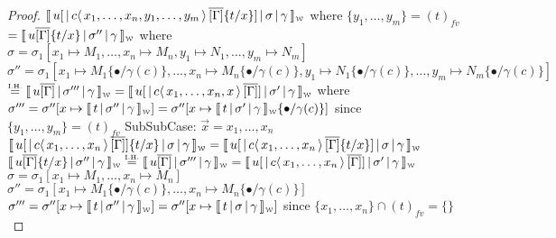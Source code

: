 \documentclass[a4paper,UKenglish,cleveref, autoref]{lipics-v2019}
\newcommand{\fv}[1]{(#1)_{fv}}
\newcommand{\set}[1]{ \{ #1 \} }
\newcommand{\dist}[5]{#1 [ #2 \, \vert \, \fakedist{#4}{#5} \, #3 ]}
\newcommand{\fakedist}[2]{#1 \langle \, #2 \, \rangle}
\newcommand{\sub}[3]{#1 \{ #2 / #3 \}}
\newcommand{\weaksymbol}{\mbox{\tiny $\mathcal{W}$}}
\newcommand{\readweakwmap}[3]{\llbracket \, #1 \, \vert \, #2 \, \vert \, #3  \, \rrbracket_{\weaksymbol} }
\newcommand{\IH}{\stackrel{\hbox{\tiny I.H.}}{\hbox{=}}}
\begin{document}
\begin{proof}
\newline
$\readweakwmap{\dist{u}{}{\overline{[\Gamma]}  \sub{}{t}{x}}{c}{x_{1}, \dots, x_{n}, y_{1}, \dots, y_{m}}}{\sigma}{\gamma}$
\newline
where $\set{y_{1}, \dots, y_{m}} = \fv{t}$
\newline
$= \readweakwmap{u \overline{[\Gamma]} \sub{}{t}{x}}{\sigma''}{\gamma}$
\newline
where
\newline
$\sigma = \sigma_{1}[x_{1} \mapsto M_{1}, \dots, x_{n} \mapsto M_{n}, y_{1} \mapsto N_{1}, \dots, y_{m} \mapsto N_{m}]$
\newline
$\sigma'' = \sigma_{1} [ x_{1} \mapsto M_{1} \sub{}{\bullet}{\gamma(c)}, \dots, x_{n} \mapsto M_{n}\sub{}{\bullet}{\gamma(c)}, y_{1} \mapsto N_{1}\sub{}{\bullet}{\gamma(c)}, \dots, y_{m} \mapsto N_{m}\sub{}{\bullet}{\gamma(c)} ] $
\newline
$\IH \readweakwmap{u \overline{[\Gamma]} }{\sigma'''}{\gamma} = \readweakwmap{\dist{u}{}{\overline{[\Gamma]}}{c}{x_{1}, \dots, x_{n}, x}}{\sigma'}{\gamma}$
\newline
where
$\sigma''' = \sigma'' [x \mapsto \readweakwmap{t}{\sigma''}{\gamma}] = \sigma'' [x \mapsto \readweakwmap{t}{\sigma'}{\gamma} \sub{}{\bullet}{\gamma(c)}]$
\newline
since $\set{y_{1}, \dots, y_{m}} = \fv{t}$
\newline
\newline
\indent \indent SubSubCase: $\vec{x} = x_{1}, \dots, x_{n}$
\newline
$\readweakwmap{\dist{u}{}{\overline{[\Gamma]}}{c}{x_{1}, \dots, x_{n}} \sub{}{t}{x}}{\sigma}{\gamma} = \readweakwmap{\dist{u}{}{\overline{[\Gamma]} \sub{}{t}{x} }{c}{x_{1}, \dots, x_{n}} }{\sigma}{\gamma}$
\newline
$\readweakwmap{u \overline{[\Gamma]} \sub{}{t}{x}}{\sigma''}{\gamma} \IH \readweakwmap{u \overline{[\Gamma]}}{\sigma'''}{\gamma} = \readweakwmap{\dist{u}{}{\overline{[\Gamma]}}{c}{x_{1}, \dots, x_{n}} }{\sigma'}{\gamma} $
\newline
$\sigma = \sigma_{1} [x_{1} \mapsto M_{1}, \dots, x_{n} \mapsto M_{n}]$
\newline
$\sigma'' = \sigma_{1} [x_{1} \mapsto M_{1} \sub{}{\bullet}{\gamma(c)}, \dots, x_{n} \mapsto M_{n} \sub{}{\bullet}{\gamma(c)}]$
\newline
$\sigma''' = \sigma'' [x \mapsto \readweakwmap{t}{\sigma''}{\gamma}] = \sigma'' [x \mapsto \readweakwmap{t}{\sigma}{\gamma}]$
\newline
since $\set{x_{1}, \dots, x_{n}} \cap \fv{t} = \set{}$
\end{proof}
\end{document}
